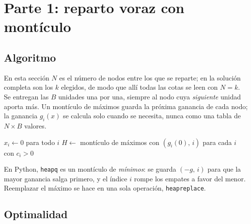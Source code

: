 \section{Parte 1: reparto voraz con montículo}\label{sec:reparto}

\subsection{Algoritmo}

En esta sección $N$ es el número de nodos entre los que se reparte; en la solución completa son los
$k$ elegidos, de modo que allí todas las cotas se leen con $N=k$. Se entregan las $B$ unidades una por una, siempre al nodo cuya \emph{siguiente} unidad aporta más.
Un montículo de máximos guarda la próxima ganancia de cada nodo; la ganancia $g_i(x)$ se calcula
solo cuando se necesita, nunca como una tabla de $N\times B$ valores.

\begin{algorithm}[H]
\caption{\textsc{RepartirVoraz}$(u_1,\dots,u_N,\ B,\ c)$ — \texttt{repartir\_voraz}}\label{alg:reparto}
$x_i\leftarrow 0$ para todo $i$\;
$H\leftarrow$ montículo de máximos con $(g_i(0),\, i)$ para cada $i$ con $c_i>0$ 
\;
\end{algorithm}

En Python, \texttt{heapq} es un montículo de \emph{mínimos}: se guarda $(-g,\,i)$ para que la mayor
ganancia salga primero, y el índice $i$ rompe los empates a favor del menor. Reemplazar el máximo
se hace en una sola operación, \texttt{heapreplace}.

\subsection{Optimalidad}

